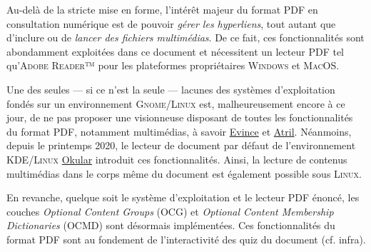 Au-delà de la stricte mise en forme, l'intérêt majeur du format PDF en consultation numérique est de pouvoir \emph{gérer les hyperliens}, tout autant que d'inclure ou de \emph{lancer des fichiers multimédias}. De ce fait, ces fonctionnalités sont abondamment exploitées dans ce document et nécessitent un lecteur PDF tel qu'\textsc{Adobe Reader}™ pour les plateformes propriétaires \textsc{Windows} et \textsc{MacOS}.

Une des seules --- si ce n'est la seule --- lacunes des systèmes d'exploitation fondés sur un environnement \textsc{Gnome}/\textsc{Linux} est, malheureusement encore à ce jour, de ne pas proposer une visionneuse disposant de toutes les fonctionnalités du format PDF, notamment multimédias, à savoir \href{https://wiki.gnome.org/Apps/Evince}{Evince} et \href{https://github.com/mate-desktop/atril}{Atril}. Néanmoins, depuis le printemps 2020, le lecteur de document par défaut de l'environnement \textsc{KDE}/\textsc{Linux} \href{https://okular.kde.org/}{Okular} introduit ces fonctionnalités. Ainsi, la lecture de contenus multimédias dans le corps même du document est également possible sous \textsc{Linux}. %

En revanche, quelque soit le système d'exploitation et le lecteur PDF énoncé, les couches \textit{Optional Content Groups} (OCG) et \textit{Optional Content Membership Dictionaries} (OCMD) sont désormais implémentées. Ces fonctionnalités du format PDF sont au fondement de l'interactivité des quiz du document (cf. infra).


